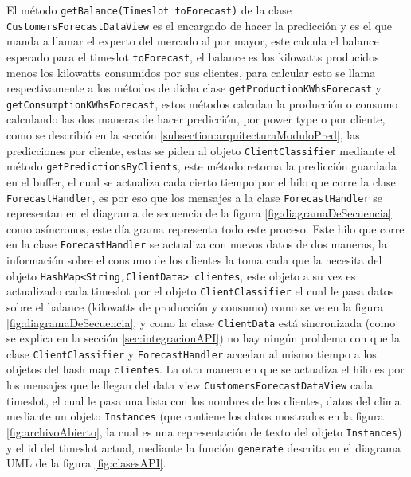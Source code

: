 El método \texttt{getBalance(Timeslot toForecast)} de la clase \texttt{CustomersForecastDataView} es el encargado de hacer la predicción y es el que manda a llamar el experto del mercado al por mayor, este calcula el balance esperado para el timeslot \texttt{toForecast}, el balance es los kilowatts producidos menos los kilowatts consumidos por sus clientes, para calcular esto se llama respectivamente a los métodos de dicha clase \texttt{getProductionKWhsForecast} y \\ \texttt{getConsumptionKWhsForecast}, estos métodos calculan la producción o consumo calculando las dos maneras de hacer predicción, por power type o por cliente, como se describió en la sección \ref{subsection:arquitecturaModuloPred}, las predicciones por cliente, estas se piden al objeto \texttt{ClientClassifier} mediante el método \texttt{getPredictionsByClients}, este método retorna la predicción guardada en el buffer, el cual se actualiza cada cierto tiempo por el hilo que corre la clase \texttt{ForecastHandler}, es por eso que los mensajes a la clase \texttt{ForecastHandler} se representan en el diagrama de secuencia de la figura \ref{fig:diagramaDeSecuencia} como asíncronos, este día grama representa todo este proceso.
Este hilo que corre en la clase \texttt{ForecastHandler} se actualiza con nuevos datos de dos maneras, la información sobre el consumo de los clientes la toma cada que la necesita del objeto \texttt{HashMap<String,ClientData> clientes}, este objeto a su vez es actualizado cada timeslot por el objeto \texttt{ClientClassifier} el cual le pasa datos sobre el balance (kilowatts de producción y consumo) como se ve en la figura \ref{fig:diagramaDeSecuencia}, 
 y como la clase \texttt{ClientData} está sincronizada (como se explica en la sección \ref{sec:integracionAPI}) no hay ningún problema con que la clase \texttt{ClientClassifier} y \texttt{ForecastHandler} accedan al mismo tiempo a los objetos del hash map \texttt{clientes}.
La otra manera en que se actualiza el hilo es por los mensajes que le llegan del data view \texttt{CustomersForecastDataView} cada timeslot, el cual le pasa una lista con los nombres de los clientes, datos del clima mediante un objeto \texttt{Instances} (que contiene los datos mostrados en la figura \ref{fig:archivoAbierto}, la cual es una representación de texto del objeto \texttt{Instances}) y el id del timeslot actual, mediante la función \texttt{generate} descrita en el diagrama UML de la figura \ref{fig:clasesAPI}.

